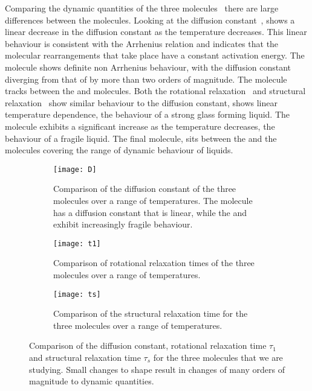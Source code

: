 Comparing the dynamic quantities of the three molecules~ there are large differences between the molecules. Looking at the diffusion constant~, \done shows a linear decrease in the diffusion constant as the temperature decreases. This linear behaviour is consistent with the Arrhenius relation and indicates that the molecular rearrangements that take place have a constant activation energy. The \dcon molecule shows definite non Arrhenius behaviour, with the diffusion constant diverging from that of \done by more than two orders of magnitude. The \tri molecule tracks between the \done and \dcon molecules. Both the rotational relaxation~ and structural relaxation~ show similar behaviour to the diffusion constant, \done shows linear temperature dependence, the behaviour of a strong glass forming liquid. The \dcon molecule exhibits a significant increase as the temperature decreases, the behaviour of a fragile liquid. The final molecule, \tri sits between the \done and the \dcon molecules covering the range of dynamic behaviour of liquids.

\begin{figure}
    \centering
    \begin{subfigure}{\linewidth}
        \centering
        \texttt{[image: D]}
        \caption{Comparison of the diffusion constant of the three molecules over a range of temperatures. The \done molecule has a diffusion constant that is linear, while the \tri and \scon exhibit increasingly fragile behaviour.}
        \label{fig:diffusion constant}
    \end{subfigure}
    \begin{subfigure}{\linewidth}
        \centering
        \texttt{[image: t1]}
        \caption{Comparison of rotational relaxation times of the three molecules over a range of temperatures.}
        \label{fig:tau1}
    \end{subfigure}
    \begin{subfigure}{\textwidth}
        \centering
        \texttt{[image: ts]}
        \caption{Comparison of the structural relaxation time for the three molecules over a range of temperatures.}
        \label{fig:struct relax}
    \end{subfigure}
    \caption{Comparison of the diffusion constant, rotational relaxation time $\tau_1$ and structural relaxation time $\tau_s$ for the three molecules that we are studying. Small changes to shape result in changes of many orders of magnitude to dynamic quantities.}
    \label{fig:dynamic comparison}
\end{figure}

